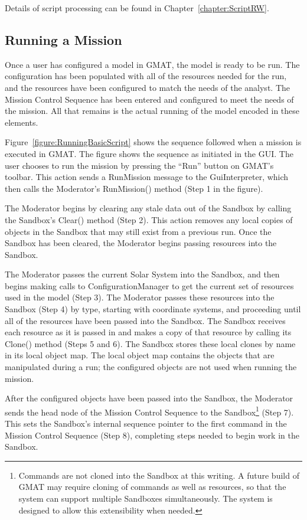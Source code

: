 Details of script processing can be found in Chapter~\ref{chapter:ScriptRW}.

\subsection{\label{section:SandboxMCSExecution}Running a Mission}

Once a user has configured a model in GMAT, the model is ready to be run.  The configuration has
been populated with all of the resources needed for the run, and the resources have been configured
to match the needs of the analyst.  The Mission Control Sequence has been entered and configured to
meet the needs of the mission.  All that remains is the actual running of the model encoded in these
elements.

Figure~\ref{figure:RunningBasicScript} shows the sequence followed when a mission is executed in
GMAT.  The figure shows the sequence as initiated in the GUI.  The user chooses to run the mission
by pressing the ``Run'' button on GMAT's toolbar.  This action sends a RunMission message to the
GuiInterpreter, which then calls the Moderator's RunMission() method (Step 1 in the figure).

The Moderator begins by clearing any stale data out of the Sandbox by calling the Sandbox's Clear()
method (Step 2).  This action removes any local copies of objects in the Sandbox that may still
exist from a previous run.  Once the Sandbox has been cleared, the Moderator begins passing
resources into the Sandbox.

The Moderator passes the current Solar System into the Sandbox, and then begins making calls to
ConfigurationManager to get the current set of resources used in the model (Step 3).  The Moderator
passes these resources into the Sandbox (Step 4) by type, starting with coordinate systems, and
proceeding until all of the resources have been passed into the Sandbox.  The Sandbox receives each
resource as it is passed in and makes a copy of that resource by calling its Clone() method (Steps 5
and 6).  The Sandbox stores these local clones by name in its local object map.  The local object
map contains the objects that are manipulated during a run; the configured objects are not used when
running the mission.

After the configured objects have been passed into the Sandbox, the Moderator sends the head node of
the Mission Control Sequence to the Sandbox\footnote{Commands are not cloned into the Sandbox at
this writing.  A future build of GMAT may require cloning of commands as well as resources, so that
the system can support multiple Sandboxes simultaneously.  The system is designed to allow this
extensibility when needed.} (Step 7).  This sets the Sandbox's internal sequence pointer to the
first command in the Mission Control Sequence (Step 8), completing steps needed to begin work in the
Sandbox.

